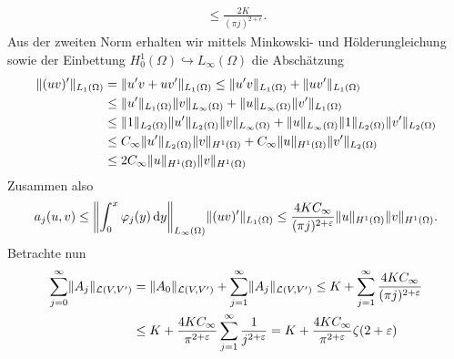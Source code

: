 \begin{Satz}
\begin{Beweis}
\begin{equation}
\begin{aligned}
                \leq \frac{2 K}{(\pi j)^{2+\epsilon}}.
            \end{aligned}
        \end{equation}
        Aus der zweiten Norm erhalten wir mittels Minkowski- und Hölderungleichung sowie der Einbettung $H^{1}_{0}(\Omega) \hookrightarrow L_{\infty}(\Omega)$ die Abschätzung
        \begin{equation}
            \begin{aligned}
                \lVert(uv)'\rVert_{L_{1}(\Omega)}
                &= \lVert u'v + uv'\rVert_{L_{1}(\Omega)}
                \leq \lVert u'v\rVert_{L_{1}(\Omega)} + \lVert uv'\rVert_{L_{1}(\Omega)}
                \\&\leq \lVert u'\rVert_{L_{1}(\Omega)} \lVert v\rVert_{L_{\infty}(\Omega)} + \lVert u\rVert_{L_{\infty}(\Omega)} \lVert v'\rVert_{L_{1}(\Omega)}
                \\&\leq \lVert1\rVert_{L_{2}(\Omega)} \lVert u'\rVert_{L_{2}(\Omega)} \lVert v\rVert_{L_{\infty}(\Omega)} + \lVert u\rVert_{L_{\infty}(\Omega)} \lVert1\rVert_{L_{2}(\Omega)} \lVert v'\rVert_{L_{2}(\Omega)}
                \\&\leq C_{\infty} \lVert u'\rVert_{L_{2}(\Omega)} \lVert v\rVert_{H^{1}(\Omega)} + C_{\infty} \lVert u\rVert_{H^{1}(\Omega)} \lVert v'\rVert_{L_{2}(\Omega)}
                \\&\leq 2 C_{\infty} \lVert u\rVert_{H^{1}(\Omega)} \lVert v\rVert_{H^{1}(\Omega)}
            \end{aligned}
        \end{equation}
        Zusammen also
        \begin{equation}
            a_{j}(u, v)
            \leq \norm*{\int_{0}^{x} \varphi_{j}(y) \diff y }_{L_{\infty}(\Omega)} \norm{(uv)'}_{L_{1}(\Omega)}
            \leq \frac{4 K C_{\infty}}{(\pi j)^{2 + \epsilon}} \norm{u}_{H^{1}(\Omega)} \norm{v}_{H^{1}(\Omega)}.
        \end{equation}
        Betrachte nun
        \begin{align}
                    \sum_{j = 0}^{\infty} \norm{A_{j}}_{\mathcal L(V, V')}
            &= \norm{A_{0}}_{\mathcal L(V, V')} + \sum_{j = 1}^{\infty} \norm{A_{j}}_{\mathcal L(V, V')}
            \leq K + \sum_{j = 1}^{\infty} \frac{4 K  C_{\infty}}{(\pi j)^{2 + \epsilon}}
            \\&\leq K + \frac{4 K  C_{\infty}}{\pi^{2 + \epsilon}} \sum_{j = 1}^{\infty} \frac{1}{j^{2 + \epsilon}}
            = K + \frac{4 K  C_{\infty}}{\pi^{2 + \epsilon}} \zeta(2 + \epsilon)

\end{align}
\end{Beweis}
\end{Satz}
